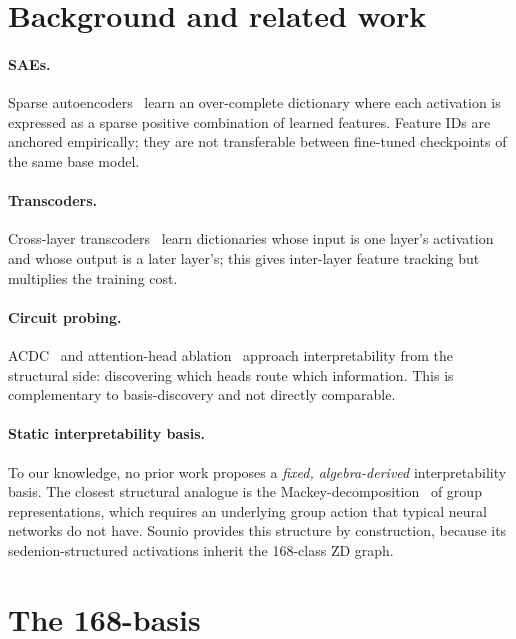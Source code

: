 \documentclass{article}
\begin{document}
\section{Background and related work}

\paragraph{SAEs.} Sparse autoencoders~\cite{bricken2023monosemanticity,
cunningham2023sparse} learn an over-complete dictionary where each
activation is expressed as a sparse positive combination of learned
features.  Feature IDs are anchored empirically; they are not
transferable between fine-tuned checkpoints of the same base model.

\paragraph{Transcoders.}  Cross-layer
transcoders~\cite{templeton2024scaling} learn dictionaries whose input
is one layer's activation and whose output is a later layer's; this
gives inter-layer feature tracking but multiplies the training cost.

\paragraph{Circuit probing.} ACDC~\cite{conmy2023automatedic} and
attention-head ablation~\cite{elhage2021mathematical} approach
interpretability from the structural side: discovering which heads
route which information.  This is complementary to basis-discovery
and not directly comparable.

\paragraph{Static interpretability basis.} To our knowledge, no prior
work proposes a \emph{fixed, algebra-derived} interpretability basis.
The closest structural analogue is the
Mackey-decomposition~\cite{mackey1978unitary} of group representations,
which requires an underlying group action that typical neural networks
do not have.  Sounio provides this structure by construction, because
its sedenion-structured activations inherit the 168-class ZD graph.

\section{The 168-basis}
\end{document}
